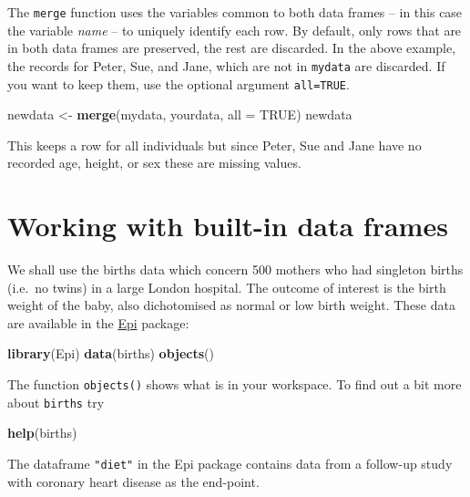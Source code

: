 \documentclass[
]{book}
\newenvironment{Shaded}{\begin{snugshade}}{\end{snugshade}}
\newcommand{\AttributeTok}[1]{\textcolor[rgb]{0.13,0.29,0.53}{#1}}
\newcommand{\ConstantTok}[1]{\textcolor[rgb]{0.56,0.35,0.01}{#1}}
\newcommand{\FunctionTok}[1]{\textcolor[rgb]{0.13,0.29,0.53}{\textbf{#1}}}
\newcommand{\NormalTok}[1]{#1}
\newcommand{\OtherTok}[1]{\textcolor[rgb]{0.56,0.35,0.01}{#1}}
\begin{document}
The \texttt{merge} function uses the variables common to both data
frames -- in this case the variable \emph{name} -- to uniquely identify
each row. By default, only rows that are in both data frames are
preserved, the rest are discarded. In the above example, the records
for Peter, Sue, and Jane, which are not in \texttt{mydata} are
discarded. If you want to keep them, use the optional argument \texttt{all=TRUE}.

\begin{Shaded}
\begin{Highlighting}[]
\NormalTok{newdata }\OtherTok{\textless{}{-}} \FunctionTok{merge}\NormalTok{(mydata, yourdata, }\AttributeTok{all =} \ConstantTok{TRUE}\NormalTok{)}
\NormalTok{newdata}
\end{Highlighting}
\end{Shaded}

This keeps a row for all individuals but since Peter, Sue and Jane
have no recorded age, height, or sex these are missing values.

\section{Working with built-in data frames}\label{working-with-built-in-data-frames}

We shall use the births data which concern 500 mothers who had
singleton births (i.e.~no twins) in a large London hospital. The
outcome of interest is the birth weight of the baby, also dichotomised
as normal or low birth weight. These data are available in the \href{https://cran.r-project.org/web/packages/Epi/index.html}{Epi}
package:

\begin{Shaded}
\begin{Highlighting}[]
\FunctionTok{library}\NormalTok{(Epi)}
\FunctionTok{data}\NormalTok{(births)}
\FunctionTok{objects}\NormalTok{()}
\end{Highlighting}
\end{Shaded}

The function \texttt{objects()} shows what is in your workspace. To
find out a bit more about \texttt{births} try

\begin{Shaded}
\begin{Highlighting}[]
\FunctionTok{help}\NormalTok{(births)}
\end{Highlighting}
\end{Shaded}

The dataframe \texttt{"diet"} in the Epi package contains data from a follow-up study with
coronary heart disease as the end-point.
\end{document}
